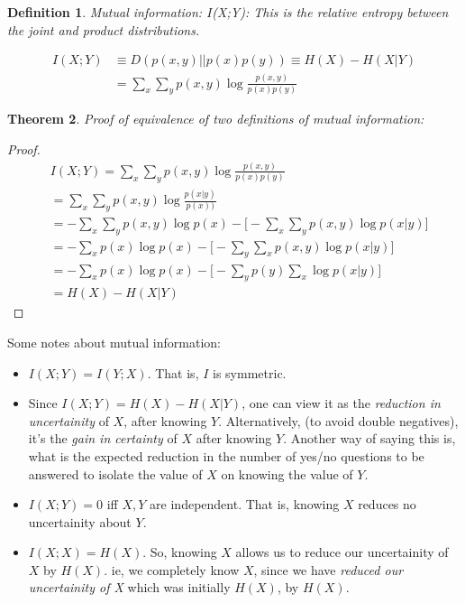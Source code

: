 \documentclass[11pt]{book}
\newtheorem{theorem}{Theorem}
\newtheorem{definition}[theorem]{Definition}
\renewcommand{\H}{\ensuremath{H}}
\newcommand{\KL}[2]{\ensuremath{D(#1 || #2)}}
\newcommand{\I}{\ensuremath{I}}
\begin{document}
\begin{definition}
    Mutual information: \I(X;Y): This is the relative entropy between the
    joint and product distributions.

    \begin{align*}
        \I(X;Y) &\equiv \KL{p(x, y)}{p(x)p(y)} \equiv H(X) - H(X|Y) \\
                &= \sum_x \sum_y p(x, y) \log \frac{p(x, y)}{p(x)p(y)}
    \end{align*}
    
\end{definition}

\begin{theorem}
    Proof of equivalence of two definitions of mutual information:
\end{theorem}
\begin{proof}
    \begin{align*}
        &\I(X;Y)  = \sum_x \sum_y p(x, y) \log \frac{p(x, y)}{p(x)p(y)} \\
        &= \sum_x \sum_y p(x, y) \log \frac{p(x|y)}{p(x))} \\
        &= - \sum_x \sum_y p(x, y) \log p(x) - \big[ - \sum_x \sum_y p(x, y) \log p(x|y) \big] \\
        &= - \sum_x p(x) \log p(x) - \big[ - \sum_y \sum_x p(x, y) \log p(x|y) \big] \\
        &= - \sum_x p(x) \log p(x) - \big[ - \sum_y p(y) \sum_x \log p(x|y) \big] \\
        &= \H(X) - H(X|Y)
    \end{align*}
\end{proof}


Some notes about mutual information:
\begin{itemize}
    \item $I(X; Y) = I(Y;X)$. That is, $I$ is symmetric.

    \item Since $I(X;Y) = H(X) - H(X|Y)$, one can view it as the 
         \textit{reduction in uncertainity} of $X$, after knowing $Y$. 
         Alternatively, (to avoid double negatives), it's the \textit{gain in
         certainty} of $X$ after knowing $Y$.  Another way of saying this is,
         what is the expected reduction in the number of yes/no questions to be
         answered to isolate the value of $X$ on knowing the value of $Y$.

    \item $I(X;Y) = 0$ iff $X, Y$ are independent. That is, knowing $X$ reduces
        no uncertainity about $Y$.

    \item $I(X;X) = H(X)$. So, knowing $X$ allows us to reduce our uncertainity
        of $X$ by $H(X)$. ie, we completely know $X$, since we have
        \textit{reduced our uncertainity of X} which was initially $H(X)$, by $H(X)$.

\end{itemize}
\end{document}
